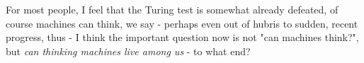 \documentclass[]{article}
\begin{document}
For most people, I feel that the Turing test is somewhat already defeated, of course machines can think, we say - perhaps even out of hubris to sudden, recent progress, thus - I think the important question now is not "can machines think?", but \emph{can thinking machines live among us} - to what end?



\end{document}

